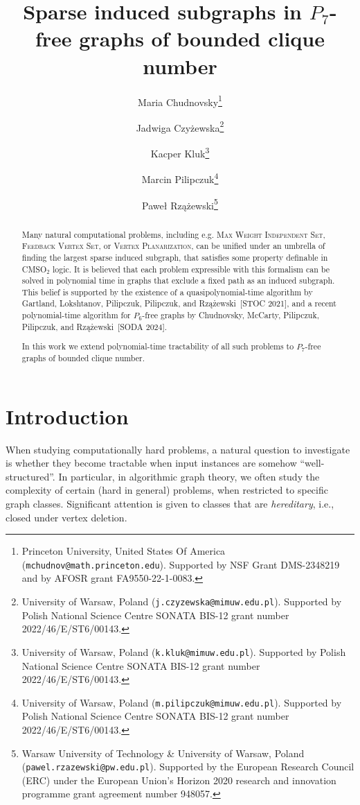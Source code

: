 \documentclass[11pt,a4paper]{article}
\title{Sparse induced subgraphs in $P_7$-free graphs of bounded clique number}
\author{Maria Chudnovsky\thanks{Princeton University, United States Of America (\texttt{mchudnov@math.princeton.edu}).
Supported by NSF Grant DMS-2348219 and by AFOSR grant FA9550-22-1-0083.}
\and Jadwiga Czyżewska\thanks{University of Warsaw, Poland (\texttt{j.czyzewska@mimuw.edu.pl}).
Supported by Polish National Science Centre SONATA BIS-12 grant number 2022/46/E/ST6/00143.}
\and Kacper Kluk\thanks{University of Warsaw, Poland (\texttt{k.kluk@mimuw.edu.pl}).
Supported by Polish National Science Centre SONATA BIS-12 grant number 2022/46/E/ST6/00143.}
\and Marcin Pilipczuk\thanks{University of Warsaw, Poland (\texttt{m.pilipczuk@mimuw.edu.pl}).
Supported by Polish National Science Centre SONATA BIS-12 grant number 2022/46/E/ST6/00143.}
\and Paweł Rzążewski\thanks{Warsaw University of Technology \& University of Warsaw, Poland (\texttt{pawel.rzazewski@pw.edu.pl}). Supported by the European Research Council (ERC) under the European Union’s Horizon 2020 research and innovation programme grant agreement number 948057.}\footnotemark[2]}
\theoremstyle{definition}
\begin{document}
\date{}
\maketitle



\begin{abstract}
    Many natural computational problems, including e.g. \textsc{Max Weight Independent Set}, \textsc{Feedback Vertex Set}, or \textsc{Vertex Planarization}, can be unified under an umbrella of finding the largest sparse induced subgraph, that satisfies some property definable in \textsf{CMSO}$_2$ logic.
    It is believed that each problem expressible with this formalism can be solved in polynomial time in graphs that exclude a fixed path as an induced subgraph.
    This belief is supported by the existence of a quasipolynomial-time algorithm by Gartland, Lokshtanov, Pilipczuk, Pilipczuk, and Rzążewski~[STOC 2021], and a recent polynomial-time algorithm for $P_6$-free graphs by Chudnovsky, McCarty, Pilipczuk, Pilipczuk, and Rzążewski~[SODA 2024].

    In this work we extend polynomial-time tractability of all such problems to $P_7$-free graphs of bounded clique number.      
\end{abstract}

\section{Introduction}
When studying computationally hard problems, a natural question to investigate is  whether they become tractable when input instances are somehow ``well-structured''.
In particular, in algorithmic graph theory, we often study the complexity of certain (hard in general) problems, when restricted to specific graph classes.
Significant attention is given to classes that are \emph{hereditary}, i.e., closed under vertex deletion.
\end{document}
